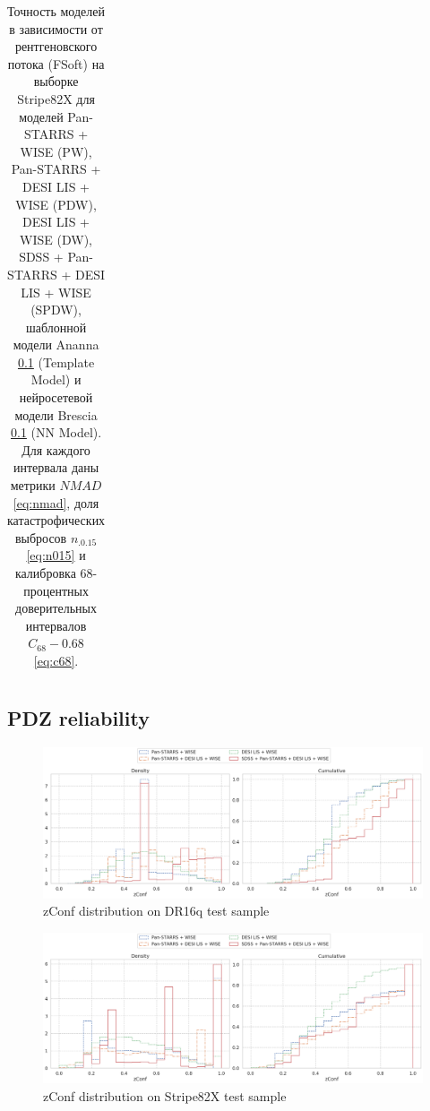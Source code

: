 \documentclass[fleqn,usenatbib]{mnras}
\begin{document}
\begin{table}
\begin{tabular}{llllllllll}
            \hline
            \end{tabular}
            \caption{Точность моделей в зависимости от рентгеновского потока (FSoft) на выборке Stripe82X для моделей Pan-STARRS + WISE (PW), Pan-STARRS + DESI LIS + WISE (PDW), DESI LIS + WISE (DW), SDSS + Pan-STARRS + DESI LIS + WISE (SPDW), шаблонной модели Ananna \ref{} (Template Model) и нейросетевой модели Brescia \ref{} (NN Model). Для каждого интервала даны метрики $NMAD$ \eqref{eq:nmad}, доля катастрофических выбросов $n_{.0.15}$ \eqref{eq:n015} и калибровка 68-процентных доверительных интервалов $C_{68} - 0.68$ \eqref{eq:c68}.}
\end{table}

\subsection{PDZ reliability}

\begin{figure}
    \centering
    \includegraphics[width=0.9\linewidth]{images/zconf-cal-dr16q.png}
    \caption{zConf distribution on DR16q test sample}
    \label{fig:zconf-cal-dr16q}
\end{figure}

\begin{figure}
    \centering
    \includegraphics[width=0.9\linewidth]{images/zconf-cal-stripe82X.png}
    \caption{zConf distribution on Stripe82X test sample}
    \label{fig:zconf-cal-stripe82X}
\end{figure}

\end{document}
